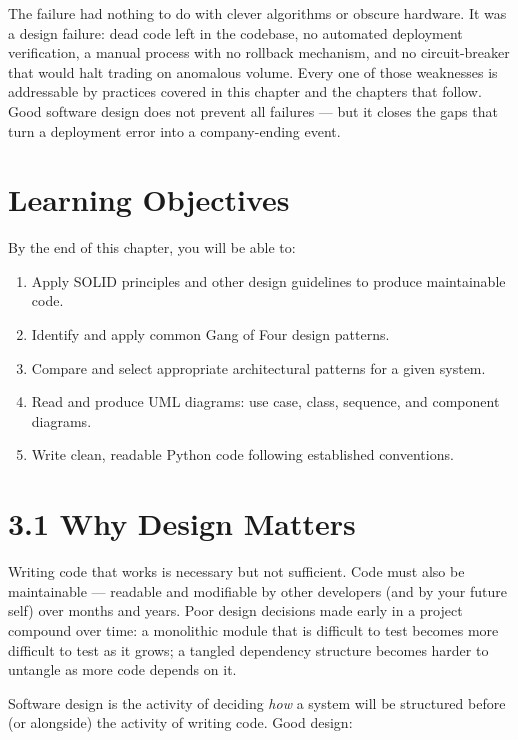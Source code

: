\documentclass[11pt,a4paper]{book}
\begin{document}
The failure had nothing to do with clever algorithms or obscure hardware. It was a design failure: dead code left in the codebase, no automated deployment verification, a manual process with no rollback mechanism, and no circuit-breaker that would halt trading on anomalous volume. Every one of those weaknesses is addressable by practices covered in this chapter and the chapters that follow. Good software design does not prevent all failures --- but it closes the gaps that turn a deployment error into a company-ending event.

\medskip

\section{Learning Objectives}

By the end of this chapter, you will be able to:

\begin{enumerate}
  \item Apply SOLID principles and other design guidelines to produce maintainable code.
  \item Identify and apply common Gang of Four design patterns.
  \item Compare and select appropriate architectural patterns for a given system.
  \item Read and produce UML diagrams: use case, class, sequence, and component diagrams.
  \item Write clean, readable Python code following established conventions.
\end{enumerate}

\medskip

\section{3.1 Why Design Matters}

Writing code that works is necessary but not sufficient. Code must also be maintainable --- readable and modifiable by other developers (and by your future self) over months and years. Poor design decisions made early in a project compound over time: a monolithic module that is difficult to test becomes more difficult to test as it grows; a tangled dependency structure becomes harder to untangle as more code depends on it.

Software design is the activity of deciding \textit{how} a system will be structured before (or alongside) the activity of writing code. Good design:
\end{document}
